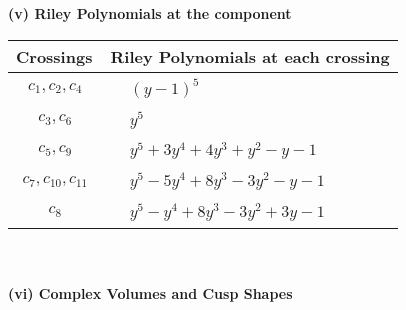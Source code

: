 \documentclass[1p]{elsarticle_modified}
\theoremstyle{definition}
\begin{document}
\newpage\renewcommand{\arraystretch}{1}
\flushleft \textbf{(v) Riley Polynomials at the component}\newline \\
\begin{tabular}{m{50pt}|m{274pt}}
Crossings & \hspace{64pt}Riley Polynomials at each crossing \\
\hline $$\begin{aligned}c_{1},c_{2},c_{4}\end{aligned}$$&$\begin{aligned}
&(y-1)^5
\end{aligned}$\\
\hline $$\begin{aligned}c_{3},c_{6}\end{aligned}$$&$\begin{aligned}
&y^5
\end{aligned}$\\
\hline $$\begin{aligned}c_{5},c_{9}\end{aligned}$$&$\begin{aligned}
&y^5+3 y^4+4 y^3+y^2- y-1
\end{aligned}$\\
\hline $$\begin{aligned}c_{7},c_{10},c_{11}\end{aligned}$$&$\begin{aligned}
&y^5-5 y^4+8 y^3-3 y^2- y-1
\end{aligned}$\\
\hline $$\begin{aligned}c_{8}\end{aligned}$$&$\begin{aligned}
&y^5- y^4+8 y^3-3 y^2+3 y-1
\end{aligned}$\\
\hline
\end{tabular}\\~\\
\newpage\flushleft \textbf{(vi) Complex Volumes and Cusp Shapes}
\end{document}
